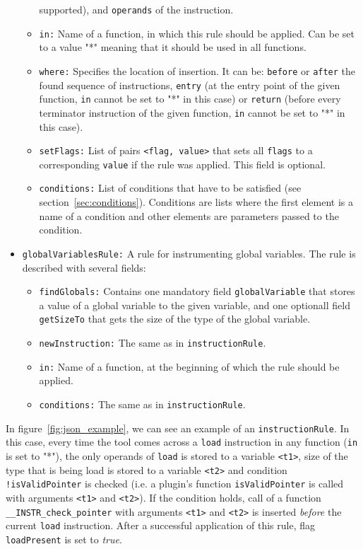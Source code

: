 \begin{itemize}
\begin{itemize}
    supported), and \texttt{operands} of the instruction.
    \item \texttt{in:} Name of a function, in which this rule should be
    applied. Can be set to a value "*" meaning that it should be used in all
    functions.
    \item \texttt{where:} Specifies the location of insertion. It can be:
      \texttt{before} or \texttt{after} the found sequence of instructions,
      \texttt{entry} (at the entry point of the given function, \texttt{in}
      cannot be set to "*" in this case) or \texttt{return} (before every
      terminator instruction of the given function, \texttt{in} cannot be set to
      "*" in this case).
    \item \texttt{setFlags:} List of pairs \texttt{<flag, value>} that sets
      all \texttt{flags} to a corresponding \texttt{value} if the rule was
      applied. This field is optional.
    \item \texttt{conditions:} List of conditions that have to be satisfied
    (see section~\ref{sec:conditions}). Conditions are lists where the first
    element is a name of a condition and other elements are parameters passed
    to the condition.
  \end{itemize}
\item \texttt{globalVariablesRule:} A rule for instrumenting global
  variables. The rule is described with several fields:
  \begin{itemize}
    \item \texttt{findGlobals:} Contains one mandatory field
    \texttt{globalVariable} that stores a value of a global variable to the
    given variable, and one optionall field \texttt{getSizeTo} that gets the
    size of the type of the global variable.
    \item \texttt{newInstruction:} The same as in \texttt{instructionRule}.
    \item \texttt{in:} Name of a function, at the beginning of which the rule
    should be applied.
    \item \texttt{conditions:} The same as in \texttt{instructionRule}.

  \end{itemize}

\end{itemize}

In figure~\ref{fig:json_example}, we can see an example of an
\texttt{instructionRule}. In this case, every time the tool comes across a
\texttt{load} instruction in any function (\texttt{in} is set to "*"), the only
operands of \texttt{load} is stored to a variable \texttt{<t1>}, size of the
type that is being load is stored to a variable \texttt{<t2>} and condition
\texttt{!isValidPointer} is checked (i.e. a plugin's function
\texttt{isValidPointer} is called with arguments \texttt{<t1>} and
\texttt{<t2>}). If the condition holds, call of a function
\texttt{\_\_INSTR\_check\_pointer} with arguments \texttt{<t1>} and
\texttt{<t2>} is inserted \emph{before} the current \texttt{load} instruction.
After a successful application of this rule, flag \texttt{loadPresent} is set
to \emph{true}.

